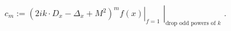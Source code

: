 \begin{equation}
  \label{eq:defcm}
c_m := \left. \left . (2 i k \cdot D_x - \Delta_x + M^2)^m f(x) \right\vert_{f = 1} \,\,
\right\vert_{\mbox{drop odd powers of $k$}}  \,\,.
\end{equation}

